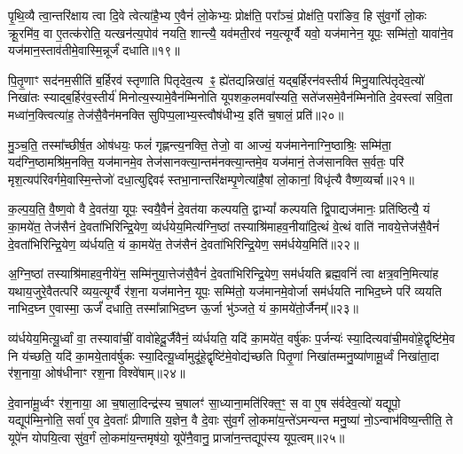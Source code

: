 {\anuvakamend[{जु॒षे॒ सते॑जस॒मन॑क्षसङ्गं बहुशा॒खं वृ॑श्चेदे॒ष वै य॒ज्ञ उपै॑न॒मुत्त॑रो य॒ज्ञ आप्त्या॒ एका॒न्नविꣳ॑श॒तिश्च॑॥३॥}]}

पृ॒थि॒व्यै त्वा॒न्तरि॑क्षाय त्वा दि॒वे त्वेत्या॑है॒भ्य ए॒वैनं॑ लो॒केभ्यः॒ प्रोक्ष॑ति॒ परा᳚ञ्चं॒ प्रोक्ष॑ति॒ परा॑ङिव॒ हि सु॑व॒र्गो लो॒कः क्रू॒रमि॑व॒ वा ए॒तत्क॑रोति॒ यत्खन॑त्य॒पोव॑ नयति॒ शान्त्यै॒ यव॑मती॒रव॑ नय॒त्यूर्ग्वै यवो॒ यज॑मानेन॒ यूपः॒ सम्मि॑तो॒ यावा॑ने॒व यज॑मान॒स्ताव॑तीमे॒वास्मि॒न्नूर्जं॑ दधाति॥१९॥

पि॒तृ॒णाꣳ सद॑नम॒सीति॑ ब॒र्\mbox{}हिरव॑ स्तृणाति पितृदेव॒त्य ꣴ॒ ह्ये॑तद्यन्निखा॑तं॒ यद्ब॒र्\mbox{}हिरन॑वस्तीर्य मिनु॒यात्पि॑तृदेव॒त्यो॑ निखा॑तः स्याद्ब॒र्\mbox{}हिर॑व॒स्तीर्य॑ मिनोत्य॒स्यामे॒वैन॑म्मिनोति यूपशक॒लमवा᳚स्यति॒ सते॑जसमे॒वैन॑म्मिनोति दे॒वस्त्वा॑ सवि॒ता मध्वा॑न॒क्त्वित्या॑ह॒ तेज॑सै॒वैन॑मनक्ति सुपिप्प॒लाभ्य॒स्त्वौष॑धीभ्य॒ इति॑ च॒षालं॒ प्रति॑॥२०॥

मु॒ञ्च॒ति॒ तस्मा᳚च्छीर्\mbox{}ष॒त ओष॑धयः॒ फलं॑ गृह्णन्त्य॒नक्ति॒ तेजो॒ वा आज्यं॒ यज॑मानेनाग्नि॒ष्ठाश्रिः॒ सम्मि॑ता॒ यद॑ग्नि॒ष्ठा\-मश्रि॑म॒नक्ति॒ यज॑मानमे॒व तेज॑सानक्त्या॒न्तम॑नक्त्या॒न्तमे॒व यज॑मानं॒ तेज॑सानक्ति स॒र्वतः॒ परि॑ मृश॒त्यप॑रिवर्गमे॒वा\-स्मि॒न्तेजो॑ दधा॒त्युद्दिवꣴ॑ स्तभा॒नान्तरि॑क्षम्पृ॒णेत्या॑है॒षां लो॒कानां॒ विधृ॑त्यै वैष्ण॒व्यर्चा॥२१॥

क॒ल्प॒य॒ति॒ वै॒ष्ण॒वो वै दे॒वत॑या॒ यूपः॒ स्वयै॒वैनं॑ दे॒वत॑या कल्पयति॒ द्वा\-भ्यां᳚ कल्पयति द्वि॒पाद्यज॑मानः॒ प्रति॑ष्ठित्यै॒ यं का॒मये॑त॒ तेज॑सैनं दे॒वता॑भिरिन्द्रि॒येण॒ व्य॑र्धयेय॒मित्य॑ग्नि॒ष्ठां तस्याश्रि॑माहव॒नीया॑दि॒त्थं वे॒त्थं वाति॑ नावये॒त्तेज॑सै॒वैनं॑ दे॒वता॑भिरिन्द्रि॒येण॒ व्य॑र्धयति॒ यं का॒मये॑त॒ तेज॑सैनं दे॒वता॑भिरिन्द्रि॒येण॒ सम॑र्धयेय॒मिति॑॥२२॥

अ॒ग्नि॒ष्ठां तस्याश्रि॑माहव॒नीये॑न॒ सम्मि॑नुया॒त्तेज॑सै॒वैनं॑ दे॒वता॑भिरिन्द्रि॒येण॒ सम॑र्धयति ब्रह्म॒वनिं॑ त्वा क्षत्र॒वनि॒मित्या॑ह यथाय॒जुरे॒वैतत्परि॑ व्यय॒त्यूर्ग्वै र॑श॒ना यज॑मानेन॒ यूपः॒ सम्मि॑तो॒ यज॑मानमे॒वोर्जा सम॑र्धयति नाभिद॒घ्ने परि॑ व्ययति नाभिद॒घ्न ए॒वास्मा॒ ऊर्जं॑ दधाति॒ तस्मा᳚न्नाभिद॒घ्न ऊ॒र्जा भु॑ञ्जते॒ यं का॒मये॑तो॒र्जैनम्᳚॥२३॥

व्य॑र्धयेय॒मित्यू॒र्ध्वां वा॒ तस्यावा॑चीं॒ वावो॑हेदू॒र्जैवैनं॒ व्य॑र्धयति॒ यदि॑ का॒मये॑त॒ वर्\mbox{}षु॑कः प॒र्जन्यः॑ स्या॒दित्यवा॑ची॒मवो॑हे॒\-द्वृष्टि॑मे॒व नि य॑च्छति॒ यदि॑ का॒मये॒ताव॑र्\mbox{}षुकः स्या॒दित्यू॒र्ध्वामुदू॑हे॒द्वृष्टि॑मे॒वोद्य॑च्छति पितृ॒णां निखा॑तम्मनु॒ष्या॑णामू॒र्ध्वं निखा॑ता॒दा र॑श॒नाया॒ ओष॑धीनाꣳ रश॒ना विश्वे॑षाम्॥२४॥

दे॒वाना॑मू॒र्ध्वꣳ र॑श॒नाया॒ आ च॒षाला॒दिन्द्र॑स्य च॒षालꣳ॑ सा॒ध्याना॒मति॑रिक्त॒ꣳ॒ स वा ए॒ष स॑र्वदेव॒त्यो॑ यद्यूपो॒ यद्यूप॑\-म्मि॒नोति॒ सर्वा॑ ए॒व दे॒वताः᳚ प्रीणाति य॒ज्ञेन॒ वै दे॒वाः सु॑व॒र्गं लो॒कमा॑य॒न्ते॑\-ऽमन्यन्त मनु॒ष्या॑ नो॒\-ऽन्वाभ॑विष्य॒न्तीति॒ ते यूपे॑न योपयि॒त्वा सु॑व॒र्गं लो॒कमा॑य॒न्तमृष॑यो॒ यूपे॑नै॒वानु॒ प्राजा॑न॒न्तद्यूप॑स्य यूप॒त्वम्॥२५॥

